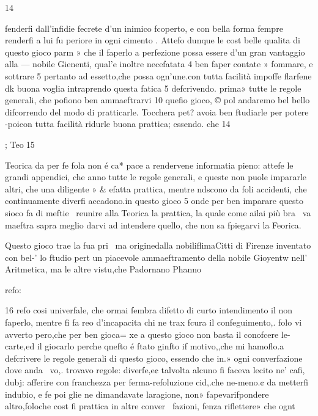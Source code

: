 \documentclass[11pt,a6paper]{article}
\begin{document}
 

14

fenderfi dall’infidie fecrete d'un
inimico fcoperto, e con bella
forma fempre renderfi a lui fu
periore in ogni cimento .
Attefo dunque le cost belle
qualita di questo gioco parm »
che il faperlo a perfezione possa
essere d’un gran vantaggio alla —
nobile Gienenti, qual’e inoltre
necefatata 4 ben faper contate »
fommare, e sottrare 5 pertanto
ad essetto,che possa ogn’une.con
tutta facilità impoffe flarfene dk
buona voglia intraprendo questa fatica 5 defcrivendo. prima»
tutte le regole generali, che
pofiono ben ammaeftrarvi 10
quefio gioco, © pol andaremo
bel bello difcorrendo del modo
di pratticarle. Tocchera pet?
avoia ben ftudiarle per potere
-poicon tutta facilità ridurle
buona prattica; essendo. che 14

; Teo15

Teorica da per fe fola non é ca*
pace a rendervene informatia
pieno: attefe le grandi appendici, che anno tutte le regole generali, e queste non puole impararle altri, che una diligente »
& efatta prattica, mentre ndscono da foli accidenti, che continuamente diverfi accadono.in
questo gioco 5 onde per ben imparare questo sioco fa di meftie~
reunire alla Teorica la prattica, la quale come ailai più bra~
va maeftra sapra meglio darvi
ad intendere quello, che non sa
fpiegarvi la Feorica.

Questo gioco trae la fua pri~
ma originedalla nobiliflimaCitti di Firenze inventato con bel-'
lo ftudio pert un piacevole ammaeftramento della nobile Gioyentw nell’ Aritmetica, ma le altre vistu,che Padornano Phanno

refo:

 

 
 

16 refo cosi univerfale, che ormai
fembra difetto di curto intendimento il non faperlo, mentre
fi fa reo d’incapacita chi ne trax
fcura il confeguimento,. folo vi
avverto pero,che per ben gioca=
xe a questo gioco non basta il
conofcere le-carte,ed il giocarlo
perche qnefto é ftato ginfto if
motivo,,che mi hamoflo.a defcrivere le regole generali di
questo gioco, essendo che in.»
ogni converfazione dove anda~
vo,. trovavo regole: diverfe,e¢
talvolta alcuno fi faceva lecito ne’ cafi, dubj: afferire con
franchezza per ferma-refoluzione cid,.che ne-meno.¢ da metterfi indubio, e fe poi glie ne
dimandavate laragione, non»
fapevarifpondere altro,foloche
cost fi prattica in altre conver~
fazioni, fenza riflettere» che
ognt
\end{document}
